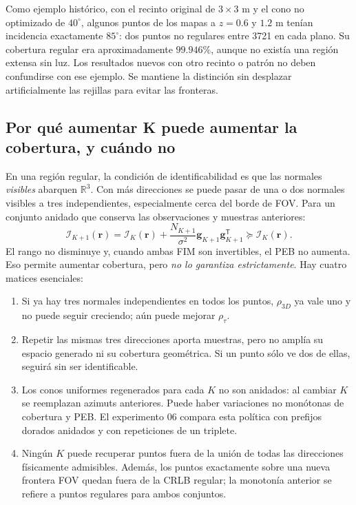 \documentclass[11pt,a4paper]{article}
\begin{document}
Como ejemplo histórico, con el recinto original de $3\times3$ m y el cono no optimizado de $40^\circ$, algunos puntos de los mapas a $z=0.6$ y $1.2$ m tenían incidencia exactamente $85^\circ$: dos puntos no regulares entre 3721 en cada plano. Su cobertura regular era aproximadamente $99.946\%$, aunque no existía una región extensa sin luz. Los resultados nuevos con otro recinto o patrón no deben confundirse con ese ejemplo. Se mantiene la distinción sin desplazar artificialmente las rejillas para evitar las fronteras.

\subsection{Por qué aumentar K puede aumentar la cobertura, y cuándo no}
En una región regular, la condición de identificabilidad es que las normales \emph{visibles} abarquen $\mathbb R^3$. Con más direcciones se puede pasar de una o dos normales visibles a tres independientes, especialmente cerca del borde de FOV. Para un conjunto anidado que conserva las observaciones y muestras anteriores:
\begin{equation}
\mathcal I_{K+1}(\mathbf r)=\mathcal I_K(\mathbf r)+\frac{N_{K+1}}{\sigma^2}\mathbf g_{K+1}\mathbf g_{K+1}^{\mathsf T}\succeq\mathcal I_K(\mathbf r).
\label{eq:K_nested_psd}
\end{equation}
El rango no disminuye y, cuando ambas FIM son invertibles, el PEB no aumenta. Eso permite aumentar cobertura, pero \emph{no lo garantiza estrictamente}. Hay cuatro matices esenciales:
\begin{enumerate}
\item Si ya hay tres normales independientes en todos los puntos, $\rho_{3D}$ ya vale uno y no puede seguir creciendo; aún puede mejorar $\rho_\tau$.
\item Repetir las mismas tres direcciones aporta muestras, pero no amplía su espacio generado ni su cobertura geométrica. Si un punto sólo ve dos de ellas, seguirá sin ser identificable.
\item Los conos uniformes regenerados para cada $K$ no son anidados: al cambiar $K$ se reemplazan azimuts anteriores. Puede haber variaciones no monótonas de cobertura y PEB. El experimento 06 compara esta política con prefijos dorados anidados y con repeticiones de un triplete.
\item Ningún $K$ puede recuperar puntos fuera de la unión de todas las direcciones físicamente admisibles. Además, los puntos exactamente sobre una nueva frontera FOV quedan fuera de la CRLB regular; la monotonía anterior se refiere a puntos regulares para ambos conjuntos.
\end{enumerate}
\end{document}
